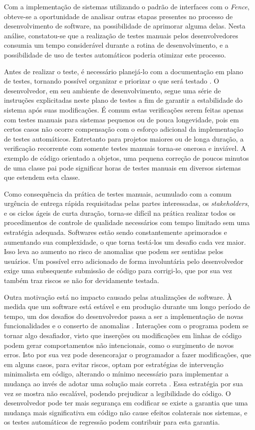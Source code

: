 Com a implementação de sistemas utilizando o padrão de interfaces com o \emph{Fence}, obteve-se a oportunidade de analisar outras etapas presentes no processo de desenvolvimento de software, na possibilidade de aprimorar alguma delas. Nesta análise, constatou-se que a realização de testes manuais pelos desenvolvedores consumia um tempo considerável durante a rotina de desenvolvimento, e a possibilidade de uso de testes automáticos poderia otimizar este processo.

Antes de realizar o teste, é necessário planejá-lo com a documentação em plano de testes, tornando possível organizar e priorizar o que será testado \cite{leung}. O desenvolvedor, em seu ambiente de desenvolvimento, segue uma série de instruções explicitadas neste plano de testes a fim de garantir a estabilidade do sistema após suas modificações. É comum estas verificações serem feitas apenas com testes manuais para sistemas pequenos ou de pouca longevidade, pois em certos casos não ocorre compensação com o esforço adicional da implementação de testes automáticos. Entretanto para projetos maiores ou de longa duração, a verificação recorrente com somente testes manuais torna-se onerosa e inviável. A exemplo de código orientado a objetos, uma pequena correção de poucos minutos de uma classe pai pode significar horas de testes manuais em diversos sistemas que estendem esta classe.

Como consequência da prática de testes manuais, acumulado com a comum urgência de entrega rápida requisitadas pelas partes interessadas, os \emph{stakeholders}, e os ciclos ágeis de curta duração, torna-se difícil na prática realizar todos os procedimentos de controle de qualidade necessários com tempo limitado sem uma estratégia adequada. Softwares estão sendo constantemente aprimorados e aumentando sua complexidade, o que torna testá-los um desafio cada vez maior. Isso leva ao aumento no risco de anomalias que podem ser sentidas pelos usuários. Um possível erro adicionado de forma involuntária pelo desenvolvedor exige uma subsequente submissão de código para corrigi-lo, que por sua vez também traz riscos se não for devidamente testada.

Outra motivação está no impacto causado pelas atualizações de software. À medida que um software está estável e em produção durante um longo período de tempo, um dos desafios do desenvolvedor passa a ser a implementação de novas funcionalidades e o conserto de anomalias \cite{gupta}. Interações com o programa podem se tornar algo desafiador, visto que inserções ou modificações em linhas de código podem gerar comportamentos não intencionais, como o surgimento de novos erros. Isto por sua vez pode desencorajar o programador a fazer modificações, que em alguns casos, para evitar riscos, optam por estratégias de intervenção minimalista em código, alterando o mínimo necessário para implementar a mudança ao invés de adotar uma solução mais correta \cite{mikkonen}. Essa estratégia por sua vez se mostra não escalável, podendo prejudicar a legibilidade do código. O desenvolvedor pode ter mais segurança em codificar se existe a garantia que uma mudança mais significativa em código não cause efeitos colaterais nos sistemas, e os testes automáticos de regressão podem contribuir para esta garantia.

